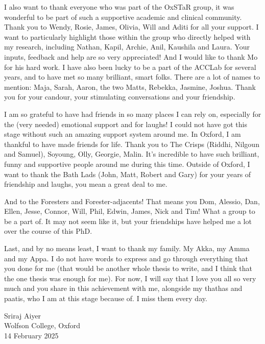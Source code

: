 \documentclass[a4paper, nobind]{templates/ociamthesis}
\begin{document}
\begin{romanpages}
\begin{acknowledgements}
 \hfill\break
 I also want to thank everyone who was part of the OxSTaR group, it was wonderful to be part of such a supportive academic and clinical community. Thank you to Wendy, Rosie, James, Olivia, Will and Aditi for all your support. I want to particularly highlight those within the group who directly helped with my research, including Nathan, Kapil, Archie, Anil, Kaushila and Laura. Your inputs, feedback and help are so very appreciated! And I would like to thank Mo for his hard work. I have also been lucky to be a part of the ACCLab for several years, and to have met so many brilliant, smart folks. There are a lot of names to mention: Maja, Sarah, Aaron, the two Matts, Rebekka, Jasmine, Joshua. Thank you for your candour, your stimulating conversations and your friendship.

 \hfill\break
 I am so grateful to have had friends in so many places I can rely on, especially for the (very needed) emotional support and for laughs! I could not have got this stage without such an amazing support system around me. In Oxford, I am thankful to have made friends for life. Thank you to The Crisps (Riddhi, Nilgoun and Samuel), Soyoung, Olly, Georgie, Malin. It's incredible to have such brilliant, funny and supportive people around me during this time. Outside of Oxford, I want to thank the Bath Lads (John, Matt, Robert and Gary) for your years of friendship and laughs, you mean a great deal to me.

 \hfill\break
 And to the Foresters and Forester-adjacents! That means you Dom, Alessio, Dan, Ellen, Jesse, Connor, Will, Phil, Edwin, James, Nick and Tim! What a group to be a part of. It may not seem like it, but your friendships have helped me a lot over the course of this PhD.

 \hfill\break
 Last, and by no means least, I want to thank my family. My Akka, my Amma and my Appa. I do not have words to express and go through everything that you done for me (that would be another whole thesis to write, and I think that the one thesis was enough for me). For now, I will say that I love you all so very much and you share in this achievement with me, alongside my thathas and paatis, who I am at this stage because of. I miss them every day.

 \begin{flushright}
 Sriraj Aiyer\\
 Wolfson College, Oxford \\
 14 February 2025
 \end{flushright}
\end{acknowledgements}




\end{romanpages}
\end{document}
